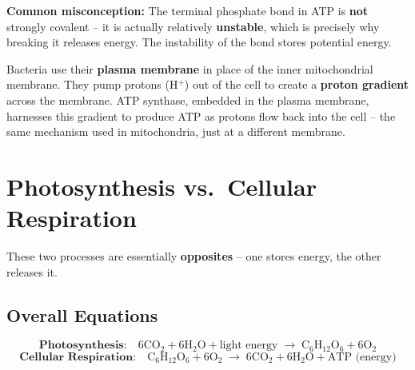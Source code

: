 \documentclass[11pt, letterpaper]{article}
\begin{document}
\begin{tcolorbox}[colback=part4bg, colframe=sectionorange, arc=3pt, boxrule=1pt]
\textbf{Common misconception:} The terminal phosphate bond in ATP is \textbf{not} strongly covalent -- it is actually relatively \textbf{unstable}, which is precisely why breaking it releases energy. The instability of the bond stores potential energy.
\end{tcolorbox}

\begin{tcolorbox}[colback=part2bg, colframe=sectiongreen,
  title={\bfseries How Do Bacteria Make ATP Without Mitochondria?}, arc=3pt, boxrule=1pt]
Bacteria use their \textbf{plasma membrane} in place of the inner mitochondrial membrane. They pump protons (H$^+$) out of the cell to create a \textbf{proton gradient} across the membrane. ATP synthase, embedded in the plasma membrane, harnesses this gradient to produce ATP as protons flow back into the cell -- the same mechanism used in mitochondria, just at a different membrane.
\end{tcolorbox}

\section*{Photosynthesis vs.\ Cellular Respiration}

These two processes are essentially \textbf{opposites} -- one stores energy, the other releases it.

\subsection*{Overall Equations}
\[
  \textbf{Photosynthesis:} \quad 6\text{CO}_2 + 6\text{H}_2\text{O} + \text{light energy} \;\longrightarrow\; \text{C}_6\text{H}_{12}\text{O}_6 + 6\text{O}_2
\]
\[
  \textbf{Cellular Respiration:} \quad \text{C}_6\text{H}_{12}\text{O}_6 + 6\text{O}_2 \;\longrightarrow\; 6\text{CO}_2 + 6\text{H}_2\text{O} + \text{ATP (energy)}
\]
\end{document}
